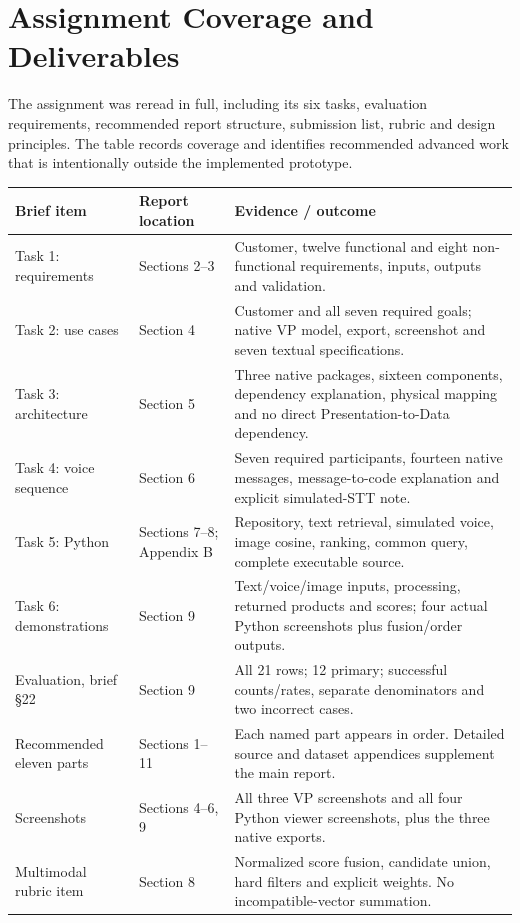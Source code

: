 \documentclass[11pt,a4paper]{article}
\begin{document}
\appendix
\clearpage\section{Assignment Coverage and Deliverables}\label{app:compliance}
The assignment was reread in full, including its six tasks, evaluation requirements, recommended report structure, submission list, rubric and design principles. The table records coverage and identifies recommended advanced work that is intentionally outside the implemented prototype.
\begin{longtable}{@{}P{3.15cm}P{3.1cm}P{9.15cm}@{}}
\toprule\textbf{Brief item}&\textbf{Report location}&\textbf{Evidence / outcome}\\\midrule\endhead
Task 1: requirements&Sections 2--3&Customer, twelve functional and eight non-functional requirements, inputs, outputs and validation.\\
Task 2: use cases&Section 4&Customer and all seven required goals; native VP model, export, screenshot and seven textual specifications.\\
Task 3: architecture&Section 5&Three native packages, sixteen components, dependency explanation, physical mapping and no direct Presentation-to-Data dependency.\\
Task 4: voice sequence&Section 6&Seven required participants, fourteen native messages, message-to-code explanation and explicit simulated-STT note.\\
Task 5: Python&Sections 7--8; Appendix B&Repository, text retrieval, simulated voice, image cosine, ranking, common query, complete executable source.\\
Task 6: demonstrations&Section 9&Text/voice/image inputs, processing, returned products and scores; four actual Python screenshots plus fusion/order outputs.\\
Evaluation, brief \S22&Section 9&All 21 rows; 12 primary; successful counts/rates, separate denominators and two incorrect cases.\\
Recommended eleven parts&Sections 1--11&Each named part appears in order. Detailed source and dataset appendices supplement the main report.\\
Screenshots&Sections 4--6, 9&All three VP screenshots and all four Python viewer screenshots, plus the three native exports.\\
Multimodal rubric item&Section 8&Normalized score fusion, candidate union, hard filters and explicit weights. No incompatible-vector summation.\\

\end{longtable}
\end{document}
